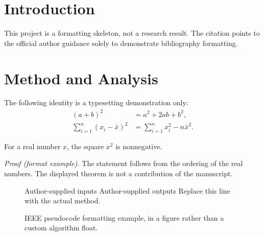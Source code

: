 \section{Introduction}
\label{sec:introduction}
This project is a formatting skeleton, not a research result. The citation
\cite{formatguide} points to the official author guidance solely to demonstrate bibliography formatting.

\section{Method and Analysis}
\label{sec:method}
The following identity is a typesetting demonstration only:
\begin{equation}
\label{eq:identity}
\begin{aligned}
 (a+b)^2 &= a^2 + 2ab + b^2,\\
 \sum_{i=1}^{n}(x_i-\bar x)^2
 &= \sum_{i=1}^{n}x_i^2-n\bar x^2.
\end{aligned}
\end{equation}
\begin{PWTheorem}
For a real number $x$, the square $x^2$ is nonnegative.
\end{PWTheorem}
\textit{Proof (format example).} The statement follows from the ordering of the real numbers.
The displayed theorem is not a contribution of the manuscript.

\begin{figure}[htbp]
\begin{algorithmic}[1]
\REQUIRE Author-supplied inputs
\ENSURE Author-supplied outputs
\STATE Replace this line with the actual method.
\end{algorithmic}
\caption{IEEE pseudocode formatting example, in a figure rather than a custom algorithm float.}
\label{alg:format}
\end{figure}

